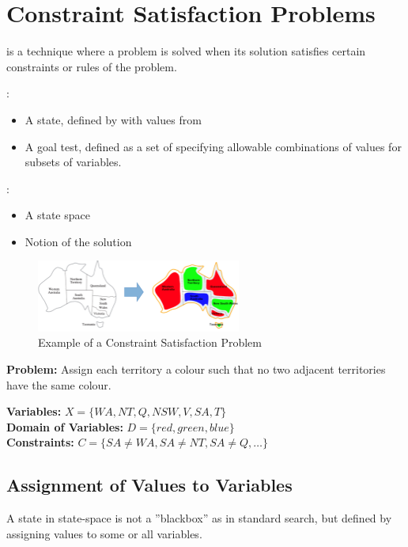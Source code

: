 \documentclass[
../../EiKI_Summary.tex,
]
{subfiles}
\begin{document}
\section{Constraint Satisfaction Problems}
\begin{defbox}
     is a technique where a problem is solved when its solution satisfies certain constraints or rules of the problem.
\end{defbox}

:
\begin{itemize}
    \item A state, defined by  with  values from 
    \item A goal test, defined as a set of  specifying allowable combinations of values for subsets of variables.
\end{itemize}

:
\begin{itemize}
    \item A state space
    \item Notion of the solution
\end{itemize}

\begin{figure}
    [H]
    \centering
    \caption{Example of a Constraint Satisfaction Problem}
    \includegraphics[width=0.6\textwidth]{Pics/05/ConstraintSatisfactionProblemEx.png}
\end{figure}
\textbf{Problem:} Assign each territory a colour such that no two adjacent territories have the same colour.

\textbf{Variables:} $X = \{WA, NT,Q,NSW,V,SA,T\}$\\
\textbf{Domain of Variables:} $D = \{red, green, blue\}$\\
\textbf{Constraints:} $C = \{SA \not= WA, SA \not= NT, SA \not=Q,\dots\}$

\subsection{Assignment of Values to Variables}
A state in state-space is not a ''blackbox'' as in standard search, but defined by assigning values to some or all variables.
\end{document}
